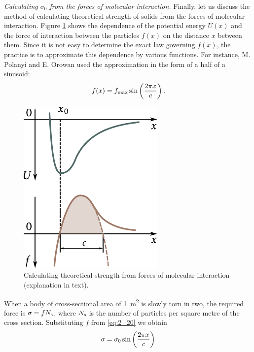 \textit{Calculating $\sigma_0$ from the forces of molecular interaction.} Finally, let us discuss the method of calculating theoretical strength of solids from the forces of molecular interaction. Figure \ref{fig:2_26} shows the dependence of the potential energy $U(x)$ and the force of interaction between the particles $f(x)$ on the distance $x$ between them. Since it is not easy to determine the exact law governing $f(x)$, the practice is to approximate this dependence by various functions. For instance, M. Polanyi and E. Orowan used the approximation in the form of a half of a sinusoid:
\begin{equation}\label{eq:2_20}
	f(x) = f_{\text{max}} \sin\left(\frac{2\pi x}{c}\right).
\end{equation}

\begin{figure}[t]
	\begin{center}
		\includegraphics[scale=1.0]{figures/ch_02/fig_2_26.pdf}
		\caption[]{Calculating theoretical strength from forces of molecular interaction (explanation in text).}
		\label{fig:2_26}
	\end{center}
	\vspace{-0.7cm}
\end{figure}

\noindent
When a body of cross-sectional area of \SI{1}{\metre\squared} is slowly torn in two, the required force is $\sigma=fN_{\text{s}}$, where $N_{\text{s}}$ is the number of particles per square metre of the cross section. Substituting $f$ from \eqref{eq:2_20} we obtain
\begin{equation}\label{eq:2_21}
	\sigma = \sigma_0 \sin\left(\frac{2\pi x}{c}\right)
\end{equation}

